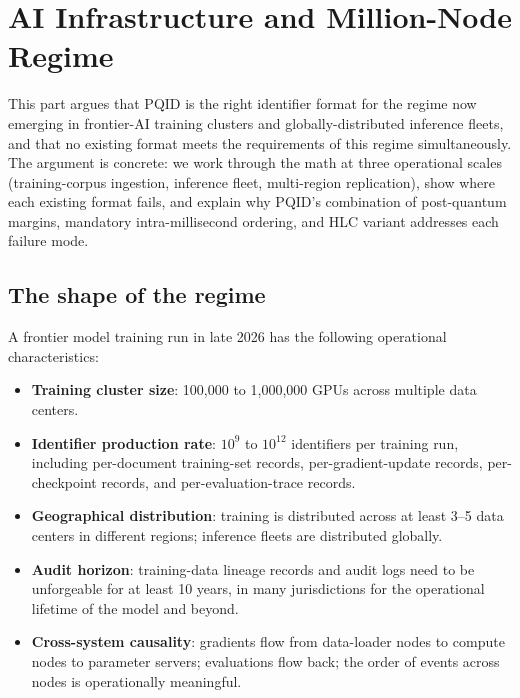 \section{AI Infrastructure and Million-Node Regime}
\label{sec:ai-scale}

This part argues that PQID is the right identifier format for the regime now emerging in frontier-AI training clusters and globally-distributed inference fleets, and that no existing format meets the requirements of this regime simultaneously. The argument is concrete: we work through the math at three operational scales (training-corpus ingestion, inference fleet, multi-region replication), show where each existing format fails, and explain why PQID's combination of post-quantum margins, mandatory intra-millisecond ordering, and HLC variant addresses each failure mode.

\subsection{The shape of the regime}

A frontier model training run in late 2026 has the following operational characteristics:

\begin{itemize}
  \item \textbf{Training cluster size}: 100{,}000 to 1{,}000{,}000 GPUs across multiple data centers.
  \item \textbf{Identifier production rate}: $10^9$ to $10^{12}$ identifiers per training run, including per-document training-set records, per-gradient-update records, per-checkpoint records, and per-evaluation-trace records.
  \item \textbf{Geographical distribution}: training is distributed across at least 3--5 data centers in different regions; inference fleets are distributed globally.
  \item \textbf{Audit horizon}: training-data lineage records and audit logs need to be unforgeable for at least 10 years, in many jurisdictions for the operational lifetime of the model and beyond.
  \item \textbf{Cross-system causality}: gradients flow from data-loader nodes to compute nodes to parameter servers; evaluations flow back; the order of events across nodes is operationally meaningful.
\end{itemize}

